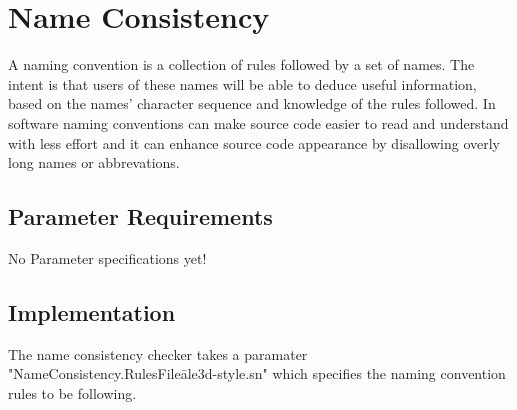 %
%

\section{Name Consistency}
\label{NameConsistency::overview}
A naming convention is a collection of rules followed by a set of names. The intent is that users of these names will be able to deduce useful information, based on the names' character sequence and knowledge of the rules followed. In software naming conventions can make source code easier to
read and understand with less effort and it can enhance source code appearance by disallowing overly long names or abbrevations.

\subsection{Parameter Requirements}

   No Parameter specifications yet!

\subsection{Implementation}

The name consistency checker takes a paramater "NameConsistency.RulesFile\=ale3d-style.sn" which 
specifies the naming convention rules to be following.

